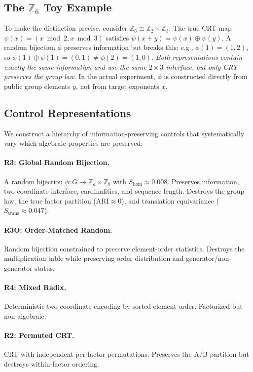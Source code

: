 \documentclass[11pt,a4paper]{article}
\theoremstyle{definition}
\theoremstyle{remark}
\newcommand{\Z}{\mathbb{Z}}
\newcommand{\Shom}{S_{\mathrm{hom}}}
\newcommand{\Strans}{S_{\mathrm{trans}}}
\newcommand{\ARI}{\mathrm{ARI}}
\begin{document}
\subsection{The $\Z_6$ Toy Example}

To make the distinction precise, consider $\Z_6 \cong \Z_2 \times \Z_3$. The true CRT map $\psi(x) = (x \bmod 2, x \bmod 3)$ satisfies $\psi(x+y) = \psi(x) \oplus \psi(y)$. A random bijection $\phi$ preserves information but breaks this: e.g., $\phi(1) = (1,2)$, so $\phi(1) \oplus \phi(1) = (0,1) \neq \phi(2) = (1,0)$. \emph{Both representations contain exactly the same information and use the same $2 \times 3$ interface, but only CRT preserves the group law.} In the actual experiment, $\phi$ is constructed directly from public group elements $y$, not from target exponents $x$.

\subsection{Control Representations}

We construct a hierarchy of information-preserving controls that systematically vary which algebraic properties are preserved:

\paragraph{R3: Global Random Bijection.} A random bijection $\phi: G \to \Z_a \times \Z_b$ with $\Shom \approx 0.008$. Preserves information, two-coordinate interface, cardinalities, and sequence length. Destroys the group law, the true factor partition ($\ARI \approx 0$), and translation equivariance ($\Strans \approx 0.047$).

\paragraph{R3O: Order-Matched Random.} Random bijection constrained to preserve element-order statistics. Destroys the multiplication table while preserving order distribution and generator/non-generator status.

\paragraph{R4: Mixed Radix.} Deterministic two-coordinate encoding by sorted element order. Factorized but non-algebraic.

\paragraph{R2: Permuted CRT.} CRT with independent per-factor permutations. Preserves the A/B partition but destroys within-factor ordering.
\end{document}

